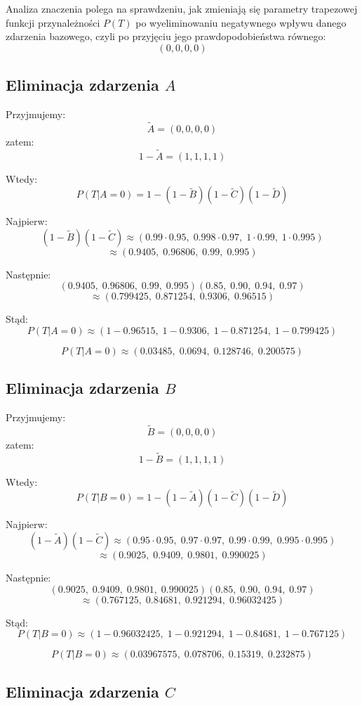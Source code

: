 \documentclass[11pt,a4paper]{article}
\begin{document}
Analiza znaczenia polega na sprawdzeniu, jak zmieniają się parametry trapezowej funkcji przynależności $P(T)$ po wyeliminowaniu negatywnego wpływu danego zdarzenia bazowego, czyli po przyjęciu jego prawdopodobieństwa równego:
\[
(0,0,0,0)
\]

\subsection{Eliminacja zdarzenia $A$}

Przyjmujemy:
\[
\tilde{A}=(0,0,0,0)
\]
zatem:
\[
1-\tilde{A}=(1,1,1,1)
\]

Wtedy:
\[
P(T|A=0)=1-(1-\tilde{B})(1-\tilde{C})(1-\tilde{D})
\]

Najpierw:
\[
(1-\tilde{B})(1-\tilde{C})\approx
(0.99\cdot0.95,\;0.998\cdot0.97,\;1\cdot0.99,\;1\cdot0.995)
\]
\[
\approx(0.9405,\;0.96806,\;0.99,\;0.995)
\]

Następnie:
\[
(0.9405,\;0.96806,\;0.99,\;0.995)(0.85,\;0.90,\;0.94,\;0.97)
\]
\[
\approx(0.799425,\;0.871254,\;0.9306,\;0.96515)
\]

Stąd:
\[
P(T|A=0)\approx
(1-0.96515,\;1-0.9306,\;1-0.871254,\;1-0.799425)
\]

\[
P(T|A=0)\approx
(0.03485,\;0.0694,\;0.128746,\;0.200575)
\]

\subsection{Eliminacja zdarzenia $B$}

Przyjmujemy:
\[
\tilde{B}=(0,0,0,0)
\]
zatem:
\[
1-\tilde{B}=(1,1,1,1)
\]

Wtedy:
\[
P(T|B=0)=1-(1-\tilde{A})(1-\tilde{C})(1-\tilde{D})
\]

Najpierw:
\[
(1-\tilde{A})(1-\tilde{C})\approx
(0.95\cdot0.95,\;0.97\cdot0.97,\;0.99\cdot0.99,\;0.995\cdot0.995)
\]
\[
\approx(0.9025,\;0.9409,\;0.9801,\;0.990025)
\]

Następnie:
\[
(0.9025,\;0.9409,\;0.9801,\;0.990025)(0.85,\;0.90,\;0.94,\;0.97)
\]
\[
\approx(0.767125,\;0.84681,\;0.921294,\;0.96032425)
\]

Stąd:
\[
P(T|B=0)\approx
(1-0.96032425,\;1-0.921294,\;1-0.84681,\;1-0.767125)
\]

\[
P(T|B=0)\approx
(0.03967575,\;0.078706,\;0.15319,\;0.232875)
\]

\subsection{Eliminacja zdarzenia $C$}
\end{document}
